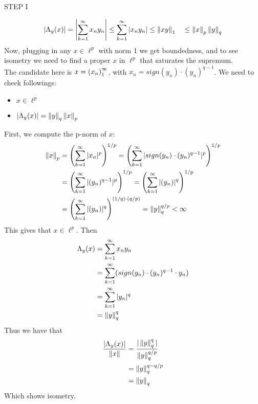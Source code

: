 \begin{theorem}
\begin{pf}{STEP I}{}
\begin{comment}
	\end{equation}
	\end{comment}
	\begin{equation}
		\left|\Lambda_y(x)\right|=\left|\sum_{k=1}^{\infty}x_ny_n\right|
		\leq\sum_{k=1}^{\infty}|x_ny_n|
		\leq\left\|{xy}\right\|_1
		\quad\leq\left\|{x}\right\|_p\left\|{y}\right\|_q
	\end{equation}
	Now, plugging in any $x\in\ell^p$ with norm 1 we get boundedness, and to see isometry we need to find a proper $x$ in $\ell^p$ that saturates the supremum.\\
	The candidate here is $x=\left({x_n}\right)_1^\infty$, with $x_n=sign(y_n)\cdot(y_n)^{q-1}$. We need to check followings:
	\begin{itemize}
		\item $x\in\ell^p$
		\item $|\Lambda_y(x)|=\left\|{y}\right\|_q\left\|{x}\right\|_p$
	\end{itemize}
	First, we compute the p-norm of $x$:
	\begin{equation}
		\begin{split}
			\left\|{x}\right\|_p&=\left(\sum_{k=1}^\infty |x_n|^p\right)^{1/p}=\left(\sum_{k=1}^\infty |sign(y_n)\cdot(y_n)^{q-1}|^p\right)^{1/p}\\
			&=\left(\sum_{k=1}^\infty |(y_n)^{q-1}|^p\right)^{1/p}=\left(\sum_{k=1}^\infty |(y_n)|^q\right)^{1/p}\\
			&=\left(\sum_{k=1}^\infty |(y_n)|^q\right)^{(1/q)\cdot (q/p)}=\left\|{y}\right\|_q^{q/p}<\infty
		\end{split}
	\end{equation}
	This gives that $x\in\ell^p$. Then
	\begin{equation}
		\begin{split}
			\Lambda_y(x)&=\sum_{k=1}^{\infty}x_ny_n\\
			&=\sum_{k=1}^{\infty}(sign(y_n)\cdot(y_n)^{q-1}\cdot y_n)\\
			&=\sum_{k=1}^{\infty}|y_n|^q\\
			&=\left\|{y}\right\|_q^q
		\end{split}
	\end{equation}
	Thus we have that 
	\begin{equation}
		\begin{split}
			\frac{|\Lambda_y(x)|}{\left\|{x}\right\|}&=\frac{|\left\|{y}\right\|_q^q|}{\left\|{y}\right\|_q^{q/p}}\\
			&=\left\|{y}\right\|_q^{q-{q/p}}\\
			&=\left\|{y}\right\|_q
		\end{split}
	\end{equation}
	Which shows isometry. 

\end{pf}
\end{theorem}
